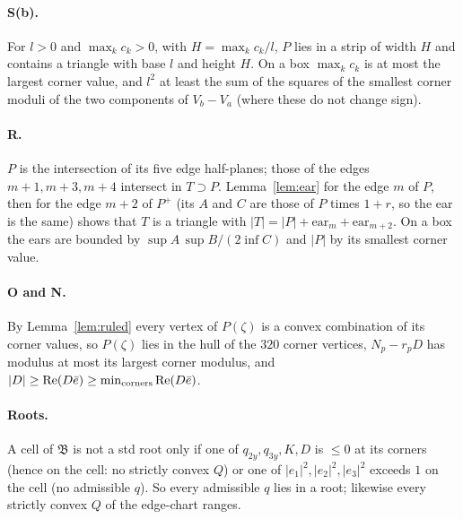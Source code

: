 \documentclass[11pt]{article}
\theoremstyle{remark}
\begin{document}
\paragraph{S(b).} For $l>0$ and $\max_kc_k>0$, with $H=\max_kc_k/l$, $P$ lies in a strip of width $H$ and contains a triangle with base $l$ and
height $H$. On a box $\max_kc_k$ is at most the largest corner value, and $l^2$ at least the sum of the squares of the
smallest corner moduli of the two components of $V_b-V_a$ (where these do not change sign).

\paragraph{R.} $P$ is the intersection of its five edge half-planes; those of the edges $m+1,m+3,m+4$ intersect in
$T\supset P$. Lemma~\ref{lem:ear} for the edge $m$ of $P$, then for the edge $m+2$ of $P^+$ (its $A$ and $C$ are those of
$P$ times $1+r$, so the ear is the same) shows that $T$ is a triangle with $|T|=|P|+\mathrm{ear}_m+\mathrm{ear}_{m+2}$.
On a box the ears are bounded by $\sup A\,\sup B/(2\inf C)$ and $|P|$ by its smallest corner value.

\paragraph{O and N.} By Lemma~\ref{lem:ruled} every vertex of $P(\zeta)$ is a convex combination of its corner values,
so $P(\zeta)$ lies in the hull of the $320$ corner vertices, $N_p-r_pD$ has modulus at most its largest corner
modulus, and $|D|\ge\mathrm{Re}(D\bar e)\ge\min_{\rm corners}\mathrm{Re}(D\bar e)$.

\paragraph{Roots.} A cell of $\mathfrak B$ is not a std root only if one of $q_{2y},q_{3y},K,D$ is $\le0$ at its corners
(hence on the cell: no strictly convex $Q$) or one of $|e_1|^2,|e_2|^2,|e_3|^2$ exceeds $1$ on the cell (no admissible
$q$). So every admissible $q$ lies in a root; likewise every strictly convex $Q$ of the edge-chart ranges.
\end{document}
